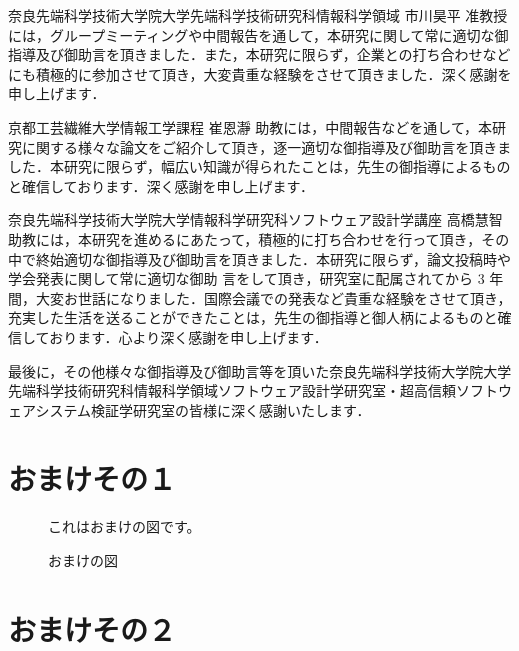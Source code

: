 \documentclass[12pt]{jarticle} %
\begin{document}
奈良先端科学技術大学院大学先端科学技術研究科情報科学領域 市川昊平 准教授には，グループミーティングや中間報告を通して，本研究に関して常に適切な御指導及び御助言を頂きました．また，本研究に限らず，企業との打ち合わせなどにも積極的に参加させて頂き，大変貴重な経験をさせて頂きました．深く感謝を申し上げます．

京都工芸繊維大学情報工学課程 崔恩瀞 助教には，中間報告などを通して，本研究に関する様々な論文をご紹介して頂き，逐一適切な御指導及び御助言を頂きました．本研究に限らず，幅広い知識が得られたことは，先生の御指導によるものと確信しております．深く感謝を申し上げます．

奈良先端科学技術大学院大学情報科学研究科ソフトウェア設計学講座 高橋慧智 助教には，本研究を進めるにあたって，積極的に打ち合わせを行って頂き，その中で終始適切な御指導及び御助言を頂きました．本研究に限らず，論文投稿時や学会発表に関して常に適切な御助 言をして頂き，研究室に配属されてから 3 年間，大変お世話になりました．国際会議での発表など貴重な経験をさせて頂き，充実した生活を送ることができたことは，先生の御指導と御人柄によるものと確信しております．心より深く感謝を申し上げます．

最後に，その他様々な御指導及び御助言等を頂いた奈良先端科学技術大学院大学先端科学技術研究科情報科学領域ソフトウェア設計学研究室・超高信頼ソフトウェアシステム検証学研究室の皆様に深く感謝いたします．



%
%
\newpage


%
%
\appendix

\section{おまけその１}
\label{omake1}



\begin{figure}
\centerline{これはおまけの図です。}
\caption{おまけの図}
\end{figure}


\section{おまけその２}
\end{document}
